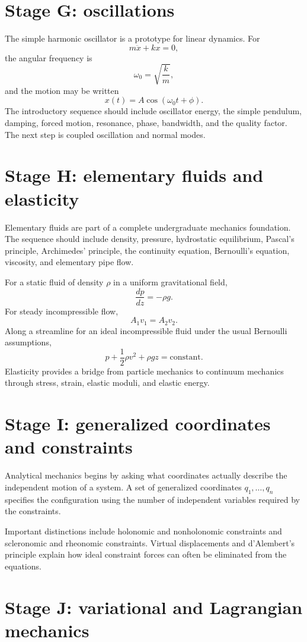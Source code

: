 \section{Stage G: oscillations}

The simple harmonic oscillator is a prototype for linear dynamics.  For
\[
m\ddot x+kx=0,
\]
the angular frequency is
\[
\omega_0=\sqrt{\frac{k}{m}},
\]
and the motion may be written
\[
x(t)=A\cos(\omega_0 t+\phi).
\]
The introductory sequence should include oscillator energy, the simple pendulum, damping, forced
motion, resonance, phase, bandwidth, and the quality factor.  The next step is coupled oscillation
and normal modes.

\section{Stage H: elementary fluids and elasticity}

Elementary fluids are part of a complete undergraduate mechanics foundation.  The sequence should
include density, pressure, hydrostatic equilibrium, Pascal's principle, Archimedes' principle, the
continuity equation, Bernoulli's equation, viscosity, and elementary pipe flow.

For a static fluid of density $\rho$ in a uniform gravitational field,
\[
\frac{dp}{dz}=-\rho g.
\]
For steady incompressible flow,
\[
A_1v_1=A_2v_2.
\]
Along a streamline for an ideal incompressible fluid under the usual Bernoulli assumptions,
\[
p+\frac12\rho v^2+\rho gz=\text{constant}.
\]
Elasticity provides a bridge from particle mechanics to continuum mechanics through stress, strain,
elastic moduli, and elastic energy.

\section{Stage I: generalized coordinates and constraints}

Analytical mechanics begins by asking what coordinates actually describe the independent motion of
a system.  A set of generalized coordinates $q_1,\ldots,q_n$ specifies the configuration using the
number of independent variables required by the constraints.

Important distinctions include holonomic and nonholonomic constraints and scleronomic and rheonomic
constraints.  Virtual displacements and d'Alembert's principle explain how ideal constraint forces
can often be eliminated from the equations.

\section{Stage J: variational and Lagrangian mechanics}

